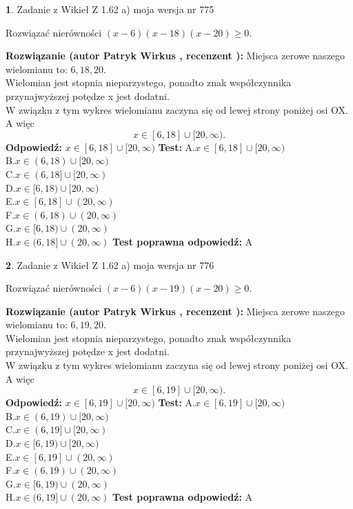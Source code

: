 \documentclass[12pt, a4paper]{article}
\theoremstyle{definition} %
\newtheorem{zad}{}
\newcommand{\zadStart}[1]{\begin{zad}#1\newline}
\newcommand{\zadStop}{\end{zad}}
\newcommand{\rozwStart}[2]{\noindent \textbf{Rozwiązanie (autor #1 , recenzent #2): }\newline}
\newcommand{\rozwStop}{\newline}
\newcommand{\odpStart}{\noindent \textbf{Odpowiedź:}\newline}
\newcommand{\odpStop}{\newline}
\newcommand{\testStart}{\noindent \textbf{Test:}\newline}
\newcommand{\testStop}{\newline}
\newcommand{\kluczStart}{\noindent \textbf{Test poprawna odpowiedź:}\newline}
\newcommand{\kluczStop}{\newline}
\begin{document}
\zadStart{Zadanie z Wikieł Z 1.62 a) moja wersja nr 775}

Rozwiązać nierówności $(x-6)(x-18)(x-20)\ge0$.
\zadStop
\rozwStart{Patryk Wirkus}{}
Miejsca zerowe naszego wielomianu to: $6, 18, 20$.\\
Wielomian jest stopnia nieparzystego, ponadto znak współczynnika przy\linebreak najwyższej potędze x jest dodatni.\\ W związku z tym wykres wielomianu zaczyna się od lewej strony poniżej osi OX. A więc $$x \in [6,18] \cup [20,\infty).$$
\rozwStop
\odpStart
$x \in [6,18] \cup [20,\infty)$
\odpStop
\testStart
A.$x \in [6,18] \cup [20,\infty)$\\
B.$x \in (6,18) \cup [20,\infty)$\\
C.$x \in (6,18] \cup [20,\infty)$\\
D.$x \in [6,18) \cup [20,\infty)$\\
E.$x \in [6,18] \cup (20,\infty)$\\
F.$x \in (6,18) \cup (20,\infty)$\\
G.$x \in [6,18) \cup (20,\infty)$\\
H.$x \in (6,18] \cup (20,\infty)$
\testStop
\kluczStart
A
\kluczStop



\zadStart{Zadanie z Wikieł Z 1.62 a) moja wersja nr 776}

Rozwiązać nierówności $(x-6)(x-19)(x-20)\ge0$.
\zadStop
\rozwStart{Patryk Wirkus}{}
Miejsca zerowe naszego wielomianu to: $6, 19, 20$.\\
Wielomian jest stopnia nieparzystego, ponadto znak współczynnika przy\linebreak najwyższej potędze x jest dodatni.\\ W związku z tym wykres wielomianu zaczyna się od lewej strony poniżej osi OX. A więc $$x \in [6,19] \cup [20,\infty).$$
\rozwStop
\odpStart
$x \in [6,19] \cup [20,\infty)$
\odpStop
\testStart
A.$x \in [6,19] \cup [20,\infty)$\\
B.$x \in (6,19) \cup [20,\infty)$\\
C.$x \in (6,19] \cup [20,\infty)$\\
D.$x \in [6,19) \cup [20,\infty)$\\
E.$x \in [6,19] \cup (20,\infty)$\\
F.$x \in (6,19) \cup (20,\infty)$\\
G.$x \in [6,19) \cup (20,\infty)$\\
H.$x \in (6,19] \cup (20,\infty)$
\testStop
\kluczStart
A
\kluczStop
\end{document}
